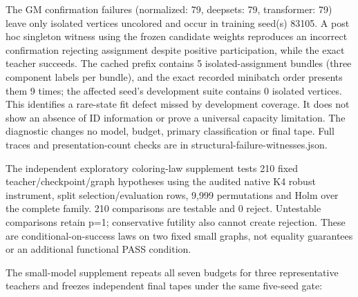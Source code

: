 \documentclass[
  11pt,
]{article}
\begin{document}
The GM confirmation failures (normalized: 79, deepsets: 79, transformer:
79) leave only isolated vertices uncolored and occur in training seed(s)
83105. A post hoc singleton witness using the frozen candidate weights
reproduces an incorrect confirmation rejecting assignment despite
positive participation, while the exact teacher succeeds. The cached
prefix contains 5 isolated-assignment bundles (three component labels
per bundle), and the exact recorded minibatch order presents them 9
times; the affected seed's development suite contains 0 isolated
vertices. This identifies a rare-state fit defect missed by development
coverage. It does not show an absence of ID information or prove a
universal capacity limitation. The diagnostic changes no model, budget,
primary classification or final tape. Full traces and presentation-count
checks are in structural-failure-witnesses.json.

The independent exploratory coloring-law supplement tests 210 fixed
teacher/checkpoint/graph hypotheses using the audited native K4 robust
instrument, split selection/evaluation rows, 9,999 permutations and Holm
over the complete family. 210 comparisons are testable and 0 reject.
Untestable comparisons retain p=1; conservative futility also cannot
create rejection. These are conditional-on-success laws on two fixed
small graphs, not equality guarantees or an additional functional PASS
condition.

The small-model supplement repeats all seven budgets for three
representative teachers and freezes independent final tapes under the
same five-seed gate:
\end{document}
